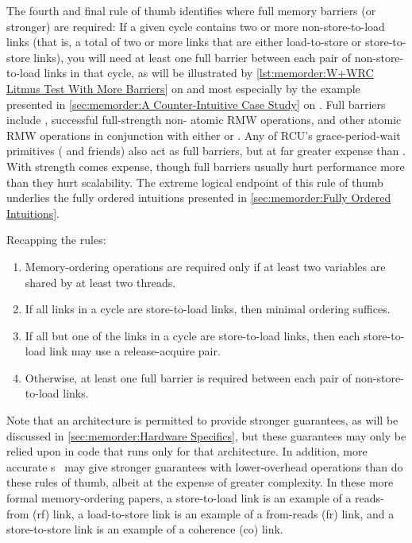 The fourth and final rule of thumb identifies where full memory barriers
(or stronger) are required:
If a given cycle contains two or more non-store-to-load links (that is, a
total of two or more links that are either load-to-store or store-to-store
links), you will need at least one full barrier between each pair of
non-store-to-load links in that cycle, as will be illustrated by
\cref{lst:memorder:W+WRC Litmus Test With More Barriers}
on
and most especially by the example presented in
\cref{sec:memorder:A Counter-Intuitive Case Study}
on
.
Full barriers include , successful full-strength non-
atomic RMW operations, and other atomic RMW operations in conjunction with
either  or .
Any of RCU's grace-period-wait primitives ( and
friends) also act as full barriers, but at far greater expense than
.
With strength comes expense, though full barriers
usually hurt performance more than they hurt scalability.
The extreme logical endpoint of this rule of thumb underlies the
fully ordered intuitions presented in
\cref{sec:memorder:Fully Ordered Intuitions}.

Recapping the rules:

\begin{enumerate}
\item	Memory-ordering operations are required only if at least
	two variables are shared by at least two threads.
\item	If all links in a cycle are store-to-load links, then
	minimal ordering suffices.
\item	If all but one of the links in a cycle are store-to-load links,
	then each store-to-load link may use a release-acquire pair.
\item	Otherwise, at least one full barrier is required between
	each pair of non-store-to-load links.
\end{enumerate}

Note that an architecture is permitted to provide stronger guarantees, as
will be discussed in
\cref{sec:memorder:Hardware Specifics},
but these guarantees may only be relied upon in code that runs only for
that architecture.
In addition, more accurate
s~\cite{Alglave:2018:FSC:3173162.3177156}
may give stronger guarantees with lower-overhead operations than do
these rules of thumb, albeit at the expense of greater complexity.
In these more formal memory-ordering papers, a store-to-load link is an
example of a reads-from (rf) link, a load-to-store link is an example
of a from-reads (fr) link, and a store-to-store link is an example of
a coherence (co) link.

